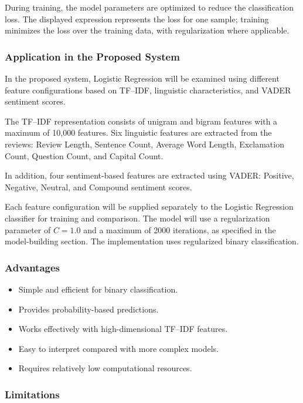 \documentclass[12pt,a4paper]{report}
\begin{document}
During training, the model parameters are optimized to reduce the classification loss. The displayed expression represents the loss for one sample; training minimizes the loss over the training data, with regularization where applicable.

\subsubsection*{Application in the Proposed System}

In the proposed system, Logistic Regression will be examined using different feature configurations based on TF--IDF, linguistic characteristics, and VADER sentiment scores.

The TF--IDF representation consists of unigram and bigram features with a maximum of 10,000 features. Six linguistic features are extracted from the reviews: Review Length, Sentence Count, Average Word Length, Exclamation Count, Question Count, and Capital Count.

In addition, four sentiment-based features are extracted using VADER: Positive, Negative, Neutral, and Compound sentiment scores.

Each feature configuration will be supplied separately to the Logistic Regression classifier for training and comparison. The model will use a regularization parameter of \(C=1.0\) and a maximum of 2000 iterations, as specified in the model-building section. The implementation uses regularized binary classification.

\subsubsection*{Advantages}

\begin{itemize}
    \item Simple and efficient for binary classification.
    \item Provides probability-based predictions.
    \item Works effectively with high-dimensional TF--IDF features.
    \item Easy to interpret compared with more complex models.
    \item Requires relatively low computational resources.
\end{itemize}

\subsubsection*{Limitations}
\end{document}
